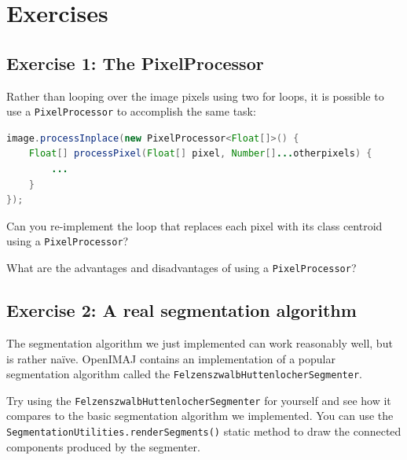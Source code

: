 \pagebreak
\section*{Exercises}
\subsection*{Exercise 1: The PixelProcessor}
Rather than looping over the image pixels using two for loops, it is possible to use a 
\verb+PixelProcessor+ to accomplish the same task:
\begin{lstlisting}[language=java]
image.processInplace(new PixelProcessor<Float[]>() {
    Float[] processPixel(Float[] pixel, Number[]...otherpixels) {
        ...
    }
});
\end{lstlisting}
Can you re-implement the loop that replaces each pixel with its class centroid 
using a \verb+PixelProcessor+? 

What are the advantages and disadvantages of using a \verb+PixelProcessor+?

\subsection*{Exercise 2: A real segmentation algorithm}
The segmentation algorithm we just implemented can work reasonably well, but is rather na\"ive. OpenIMAJ contains an 
implementation of a popular segmentation algorithm called the \verb+FelzenszwalbHuttenlocherSegmenter+. 

Try using the \verb+FelzenszwalbHuttenlocherSegmenter+ for yourself and see how it compares to the 
basic segmentation algorithm we implemented. You can use the \verb+SegmentationUtilities.renderSegments()+ 
static method to draw the connected components produced by the segmenter.

